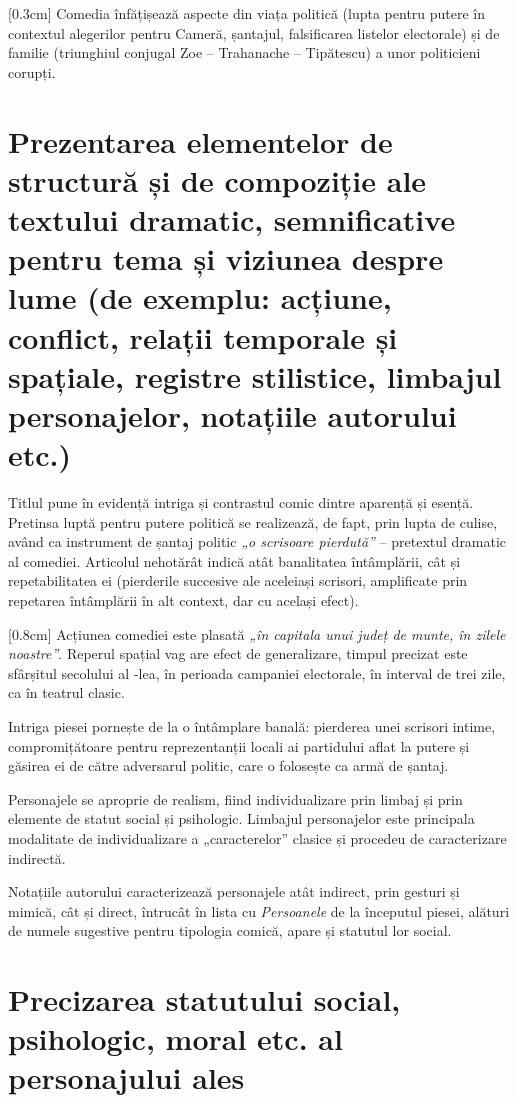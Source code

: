 [0.3cm]
Comedia înfățișează aspecte din viața politică (lupta pentru putere în contextul alegerilor pentru Cameră, șantajul, falsificarea listelor electorale) și de familie (triunghiul conjugal Zoe -- Trahanache -- Tipătescu) a unor politicieni corupți.


\section{Prezentarea elementelor de structură și de compoziție ale textului dramatic, semnificative pentru tema și viziunea despre lume {\footnotesize\normalfont(de exemplu: acțiune, conflict, relații temporale și spațiale, registre stilistice, limbajul personajelor, notațiile autorului etc.)}}

Titlul pune în evidență intriga și contrastul comic dintre aparență și esență. Pretinsa luptă pentru putere politică se realizează, de fapt, prin lupta de culise, având ca instrument de șantaj politic \textit{„o scrisoare pierdută”} -- pretextul dramatic al comediei. Articolul nehotărât indică atât banalitatea întâmplării, cât și repetabilitatea ei (pierderile succesive ale aceleiași scrisori, amplificate prin repetarea întâmplării în alt context, dar cu același efect).

[0.8cm]
Acțiunea comediei este plasată \textit{„în capitala unui județ de munte, în zilele noastre”}. Reperul spațial vag are efect de generalizare, timpul precizat este sfârșitul secolului al -lea, în perioada campaniei electorale, în interval de trei zile, ca în teatrul clasic.

Intriga piesei pornește de la o întâmplare banală: pierderea unei scrisori intime, compromițătoare pentru reprezentanții locali ai partidului aflat la putere și găsirea ei de către adversarul politic, care o folosește ca armă de șantaj.


Personajele se aproprie de realism, fiind individualizare prin limbaj și prin elemente de statut social și psihologic. Limbajul personajelor este principala modalitate de individualizare a „caracterelor” clasice și procedeu de caracterizare indirectă.

Notațiile autorului caracterizează personajele atât indirect, prin gesturi și mimică, cât și direct, întrucât în lista cu \textit{Persoanele} de la începutul piesei, alături de numele sugestive pentru tipologia comică, apare și statutul lor social.

\section{Precizarea statutului social, psihologic, moral etc. al personajului ales}


